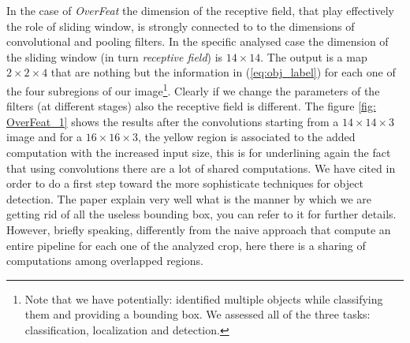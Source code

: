 In the case of \textit{OverFeat} \cite{sermanet_overfeat_2014} the dimension of the receptive field, that play effectively the role of sliding window, is strongly connected to to the dimensions of convolutional and pooling filters. In the specific analysed case the dimension of the sliding window (in turn \textit{receptive field}) is $14\times14$. The output is a map $2\times2\times4$ that are nothing but the information in (\ref{eq:obj_label}) for each one of the four subregions of our image\footnote{
    Note that we have potentially: identified multiple objects while classifying them and providing a bounding box. We assessed all of the three tasks: classification, localization and detection.
}. Clearly if we change the parameters of the filters (at different stages) also the receptive field is different. The figure \ref{fig: OverFeat_1} shows the results after the convolutions starting from a $14\times14\times3$ image and for a $16\times16\times3$, the yellow region is associated to the added computation with the increased input size, this is for underlining again the fact that using convolutions there are a lot of shared computations. We have cited \cite{sermanet_overfeat_2014} in order to do a first step toward the more sophisticate techniques for object detection. The paper explain very well what is the manner by which we are getting rid of all the useless bounding box, you can refer to it for further details. However, briefly speaking,  differently from the naive approach that compute an entire pipeline for each one of the analyzed crop, here there is a sharing of computations among overlapped regions.

